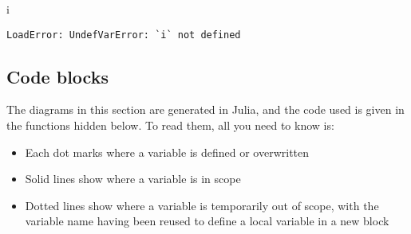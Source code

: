 \documentclass[
  letterpaper,
  DIV=11,
  numbers=noendperiod]{scrreprt}
\newenvironment{Shaded}{\begin{snugshade}}{\end{snugshade}}
\newcommand{\NormalTok}[1]{\textcolor[rgb]{0.00,0.23,0.31}{#1}}
\providecommand{\tightlist}{%
  \setlength{\itemsep}{0pt}\setlength{\parskip}{0pt}}\usepackage{longtable,booktabs,array}
\begin{document}
\begin{Shaded}
\begin{Highlighting}[]
\NormalTok{i}
\end{Highlighting}
\end{Shaded}

\begin{verbatim}
LoadError: UndefVarError: `i` not defined
\end{verbatim}

\hypertarget{code-blocks}{%
\subsection{Code blocks}\label{code-blocks}}

\begin{tcolorbox}[enhanced jigsaw, toprule=.15mm, opacitybacktitle=0.6, leftrule=.75mm, breakable, coltitle=black, bottomrule=.15mm, colbacktitle=quarto-callout-note-color!10!white, bottomtitle=1mm, rightrule=.15mm, title=\textcolor{quarto-callout-note-color}{\faInfo}\hspace{0.5em}{Note}, colframe=quarto-callout-note-color-frame, left=2mm, colback=white, opacityback=0, arc=.35mm, toptitle=1mm, titlerule=0mm]

The diagrams in this section are generated in Julia, and the code used
is given in the functions hidden below. To read them, all you need to
know is:

\begin{itemize}
\tightlist
\item
  Each dot marks where a variable is defined or overwritten
\item
  Solid lines show where a variable is in scope
\item
  Dotted lines show where a variable is temporarily out of scope, with
  the variable name having been reused to define a local variable in a
  new block
\end{itemize}

\end{tcolorbox}
\end{document}
